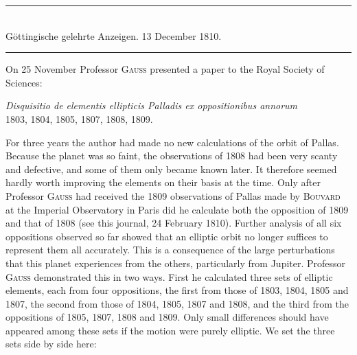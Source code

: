 \clearpage
{}
\begin{center}\rule{.75\textwidth}{.3pt}\\
Göttingische gelehrte Anzeigen. 13 December 1810.\\
\rule{.75\textwidth}{.3pt}\end{center}
On 25 November Professor \textsc{Gauss} presented a paper to the Royal Society of Sciences:
\begin{center}
\textit{Disquisitio de elementis ellipticis Palladis ex oppositionibus annorum}\\
1803, 1804, 1805, 1807, 1808, 1809.
\end{center}
For three years the author had made no new calculations of the orbit of Pallas. Because the planet was so faint, the observations of 1808 had been very scanty and defective, and some of them only became known later. It therefore seemed hardly worth improving the elements on their basis at the time. Only after Professor \textsc{Gauss} had received the 1809 observations of Pallas made by \textsc{Bouvard} at the Imperial Observatory in Paris did he calculate both the opposition of 1809 and that of 1808 (see this journal, 24 February 1810). Further analysis of all six oppositions observed so far showed that an elliptic orbit no longer suffices to represent them all accurately. This is a consequence of the large perturbations that this planet experiences from the others, particularly from Jupiter. Professor \textsc{Gauss} demonstrated this in two ways. First he calculated three sets of elliptic elements, each from four oppositions, the first from those of 1803, 1804, 1805 and 1807,
%
the second from those of 1804, 1805, 1807 and 1808, and the third from the oppositions of 1805, 1807, 1808 and 1809. Only small differences should have appeared among these sets if the motion were purely elliptic. We set the three sets side by side here:
\par\nobreak
\begingroup
\newcommand{\GaussVIAngle}[6]{%
  \makebox[17pt][r]{$#1$}\makebox[4pt][l]{${}#2$}\hspace{2pt}%
  \makebox[12pt][r]{$#3$}\makebox[4pt][l]{${}#4$}\hspace{2pt}%
  \makebox[12pt][r]{$#5$}\makebox[18pt][l]{${}#6$}%
}
